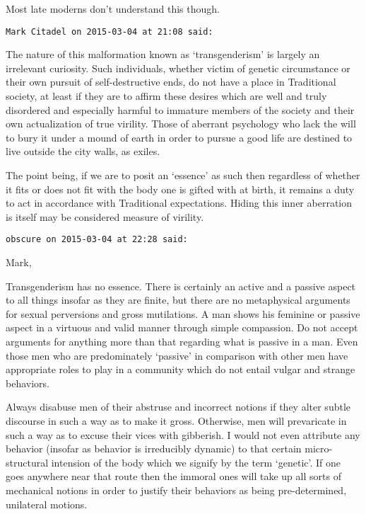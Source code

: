 \begin{footnotesize}
\begin{sffamily}
Most late moderns don't understand this though.


\hfill

\texttt{Mark Citadel on 2015-03-04 at 21:08 said: }

The nature of this malformation known as `transgenderism' is largely an irrelevant curiosity. Such individuals, whether victim of genetic circumstance or their own pursuit of self-destructive ends, do not have a place in Traditional society, at least if they are to affirm these desires which are well and truly disordered and especially harmful to immature members of the society and their own actualization of true virility. Those of aberrant psychology who lack the will to bury it under a mound of earth in order to pursue a good life are destined to live outside the city walls, as exiles.

The point being, if we are to posit an `essence' as such then regardless of whether it fits or does not fit with the body one is gifted with at birth, it remains a duty to act in accordance with Traditional expectations. Hiding this inner aberration is itself may be considered measure of virility.


\hfill

\texttt{obscure on 2015-03-04 at 22:28 said: }

Mark,

Transgenderism has no essence. There is certainly an active and a passive aspect to all things insofar as they are finite, but there are no metaphysical arguments for sexual perversions and gross mutilations. A man shows his feminine or passive aspect in a virtuous and valid manner through simple compassion. Do not accept arguments for anything more than that regarding what is passive in a man. Even those men who are predominately `passive' in comparison with other men have appropriate roles to play in a community which do not entail vulgar and strange behaviors. 

Always disabuse men of their abstruse and incorrect notions if they alter subtle discourse in such a way as to make it gross. Otherwise, men will prevaricate in such a way as to excuse their vices with gibberish. I would not even attribute any behavior (insofar as behavior is irreducibly dynamic) to that certain micro-structural intension of the body which we signify by the term `genetic'. If one goes anywhere near that route then the immoral ones will take up all sorts of mechanical notions in order to justify their behaviors as being pre-determined, unilateral motions.


\end{sffamily}
\end{footnotesize}
